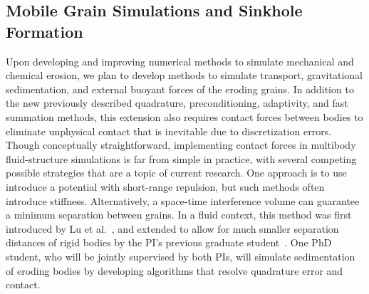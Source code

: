 \documentclass[11pt]{article}
\begin{document}

\subsection{Mobile Grain Simulations and Sinkhole Formation}
\label{sec:sinkhole}

Upon developing and improving numerical methods to simulate mechanical
and chemical erosion, we plan to develop methods to simulate transport,
gravitational sedimentation, and external buoyant forces of the eroding grains. In addition to the new previously described quadrature, preconditioning, adaptivity, and fast summation methods,  this extension also requires contact forces between bodies to eliminate unphysical contact that is inevitable due to discretization errors. Though conceptually straightforward, implementing contact forces in multibody fluid-structure simulations is far from simple in practice, with several competing possible strategies that are a topic of current research.  One approach is to use introduce a potential with short-range repulsion, but such methods often introduce stiffness. Alternatively, a space-time interference volume can guarantee a minimum separation between grains.  In a fluid context, this method was first introduced by Lu et al.~\cite{lu-rah-zor2017}, and extended to allow for much smaller separation distances of rigid bodies by the PI's previous graduate student~\cite{bys-sha-qua2019}. One PhD student, who will be jointly supervised by both PIs, will simulate sedimentation of eroding bodies by developing algorithms that resolve quadrature error and contact.  
\end{document}
